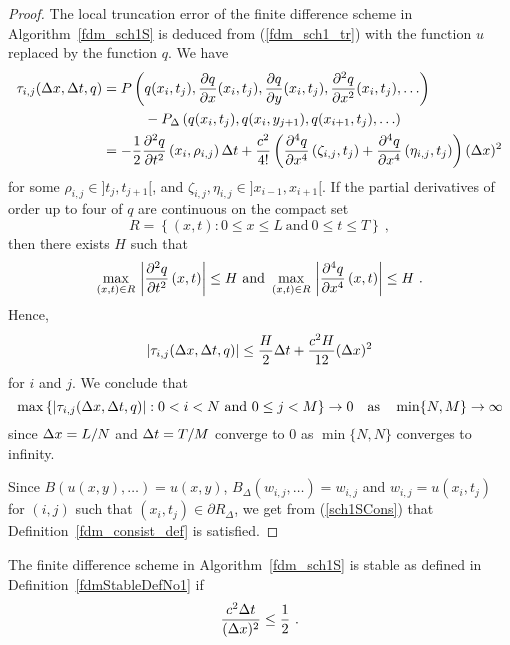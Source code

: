 \begin{proof}
The local truncation error of the finite difference scheme in
Algorithm~\ref{fdm_sch1S} is deduced from (\ref{fdm_sch1_tr}) with the
function $u$ replaced by the function $q$.  We have
\begin{align*}
\tau_{i,j}(\Delta{x},\Delta{t},q) &= 
P\left(q(x_i,t_j), \frac{\partial{q}}{\partial{x}}(x_i,t_j), \frac{\partial{q}}{\partial{y}}(x_i,t_j),
  \frac{\partial^{2}{q}}{\partial{x}^{2}}(x_i,t_j), \ldots \right) \\
&\qquad\quad
- P_\Delta\left(q(x_i,t_j), q(x_i,y_{j+1}), q(x_{i+1},t_j), \ldots\right) \\
&= -\frac{1}{2} \frac{\partial^{2}{q}}{\partial{t}^{2}}\left(x_i,\rho_{i,j}\right) \Delta{t}
+ \frac{c^2}{4!} \left( \frac{\partial^{4}{q}}{\partial{x}^{4}}\left(\zeta_{i,j},t_j\right)
+ \frac{\partial^{4}{q}}{\partial{x}^{4}}\left(\eta_{i,j},t_j\right) \right) (\Delta{x})^2
\end{align*}
for some $\rho_{i,j} \in ]t_j,t_{j+1}[$, and
$\zeta_{i,j}, \eta_{i,j} \in ]x_{i-1},x_{i+1}[$.  If the partial
derivatives of order up to four of $q$ are continuous on the compact set
\begin{equation} \label{fdm_sch1_dom}
R = \left\{ (x,t) : 0\leq x \leq L \ \text{and}\ 0 \leq t \leq T \right\} \ ,
\end{equation}
then there exists $H$ such that
\[
\max_{(x,t)\in R}\, \left|\frac{\partial^{2}{q}}{\partial{t}^{2}}\left(x,t\right) \right| \leq
H \ \text{and} \
\max_{(x,t)\in R}\, \left|\frac{\partial^{4}{q}}{\partial{x}^{4}}\left(x,t\right) \right| \leq
H \ .
\]
Hence,
\begin{equation}\label{fdm_sch1Trunc}
\left| \tau_{i,j}(\Delta{x},\Delta{t},q) \right | \leq
\frac{H}{2} \Delta{t} + \frac{c^2 H}{12} (\Delta{x})^2
\end{equation}
for $i$ and $j$.  We conclude that
\begin{equation} \label{sch1SCons}
\max \left\{ \left|\tau_{i,j}(\Delta{x},\Delta{t},q)\right| :
0<i<N \ \text{and} \ 0\leq j < M
\right\} \rightarrow 0 \quad \text{as} \quad
\min \{N, M\} \rightarrow \infty
\end{equation}
since $\Delta{x} = L/N$ and $\Delta{t} = T/M$ converge to $0$ as
$\min\{N,N\}$ converges to infinity.

Since $\displaystyle B\left(u(x,y), \ldots \right) = u(x,y)$,
$\displaystyle B_\Delta(w_{i,j},\ldots) = w_{i,j}$ and $w_{i,j} = u(x_i,t_j)$
for $(i,j)$ such that $(x_i,t_j) \in \partial R_\Delta$, we get from 
(\ref{sch1SCons}) that Definition~\ref{fdm_consist_def} is satisfied.
\end{proof}

\begin{prop}
The finite difference scheme in Algorithm~\ref{fdm_sch1S} is stable
as defined in Definition~\ref{fdmStableDefNo1} if
\[
\frac{c^2\dtx{t}}{(\dtx{x})^2} \leq \frac{1}{2} \ .
\]
\end{prop}

